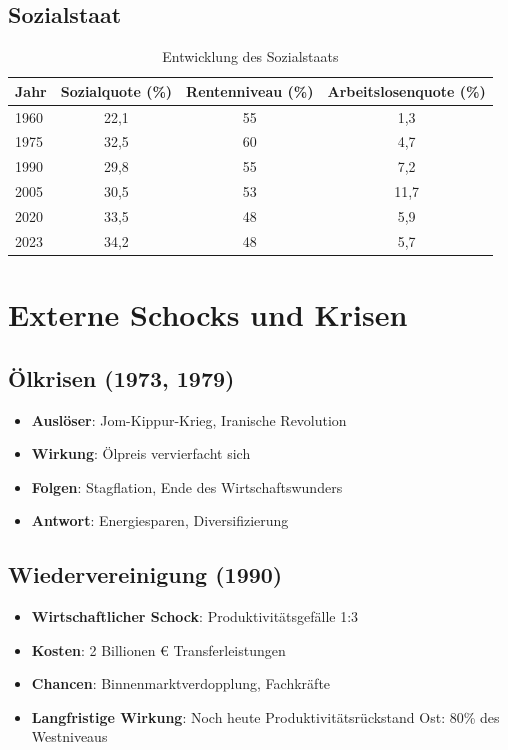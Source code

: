 \subsection{Sozialstaat}
\begin{table}[ht]
\centering
\begin{tabular}{lccc}
\toprule
\textbf{Jahr} & \textbf{Sozialquote (\%)} & \textbf{Rentenniveau (\%)} & \textbf{Arbeitslosenquote (\%)} \\
\midrule
1960 & 22,1 & 55 & 1,3 \\
1975 & 32,5 & 60 & 4,7 \\
1990 & 29,8 & 55 & 7,2 \\
2005 & 30,5 & 53 & 11,7 \\
2020 & 33,5 & 48 & 5,9 \\
2023 & 34,2 & 48 & 5,7 \\
\bottomrule
\end{tabular}
\caption{Entwicklung des Sozialstaats}
\label{tab:sozialstaat-entwicklung}
\end{table}

\section{Externe Schocks und Krisen}

\subsection{Ölkrisen (1973, 1979)}
\begin{itemize}
\item \textbf{Auslöser}: Jom-Kippur-Krieg, Iranische Revolution
\item \textbf{Wirkung}: Ölpreis vervierfacht sich
\item \textbf{Folgen}: Stagflation, Ende des Wirtschaftswunders
\item \textbf{Antwort}: Energiesparen, Diversifizierung
\end{itemize}

\subsection{Wiedervereinigung (1990)}
\begin{itemize}
\item \textbf{Wirtschaftlicher Schock}: Produktivitätsgefälle 1:3
\item \textbf{Kosten}: 2 Billionen € Transferleistungen
\item \textbf{Chancen}: Binnenmarktverdopplung, Fachkräfte
\item \textbf{Langfristige Wirkung}: Noch heute Produktivitätsrückstand Ost: 80\% des Westniveaus
\end{itemize}

